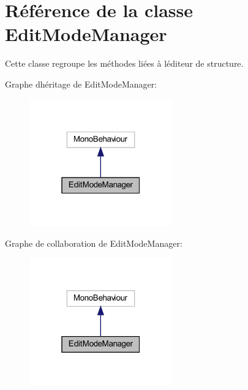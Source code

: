 \hypertarget{class_edit_mode_manager}{}\section{Référence de la classe Edit\+Mode\+Manager}
\label{class_edit_mode_manager}


Cette classe regroupe les méthodes liées à l\textquotesingle{}éditeur de structure.  




Graphe d\textquotesingle{}héritage de Edit\+Mode\+Manager\+:\nopagebreak
\begin{figure}[H]
\begin{center}
\leavevmode
\includegraphics[width=175pt]{class_edit_mode_manager__inherit__graph}
\end{center}
\end{figure}


Graphe de collaboration de Edit\+Mode\+Manager\+:\nopagebreak
\begin{figure}[H]
\begin{center}
\leavevmode
\includegraphics[width=175pt]{class_edit_mode_manager__coll__graph}
\end{center}
\end{figure}
